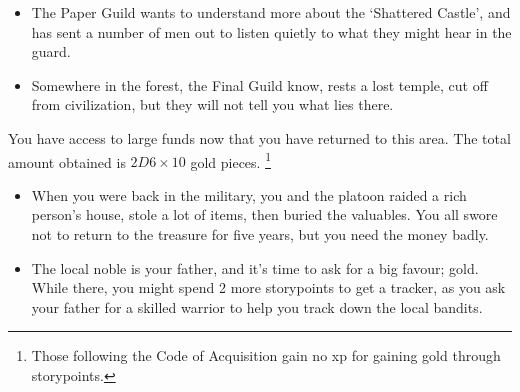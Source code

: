 \begin{multicols}{2}
\begin{itemize}
  \item
  The Paper Guild wants to understand more about the `Shattered Castle', and has sent a number of men out to listen quietly to what they might hear in the guard.
  \item
  Somewhere in the forest, the Final Guild know, rests a lost temple, cut off from civilization, but they will not tell you what lies there.

\end{itemize}

You have access to large funds now that you have returned to this area.
The total amount obtained is $2D6 \times 10$ gold pieces.%
\footnote{Those following the Code of Acquisition gain no \gls{xp} for gaining gold through \glspl{storypoint}.}

\begin{itemize}
  \item
  When you were back in the military, you and the platoon raided a rich person's house, stole a lot of items, then buried the valuables.
  You all swore not to return to the treasure for five years, but you need the money badly.
  \item
  The local noble is your father, and it's time to ask for a big favour; gold.
  While there, you might spend 2 more \glspl{storypoint} to get a tracker, as you ask your father for a skilled warrior to help you track down the local bandits.
\end{itemize}

\end{multicols}
